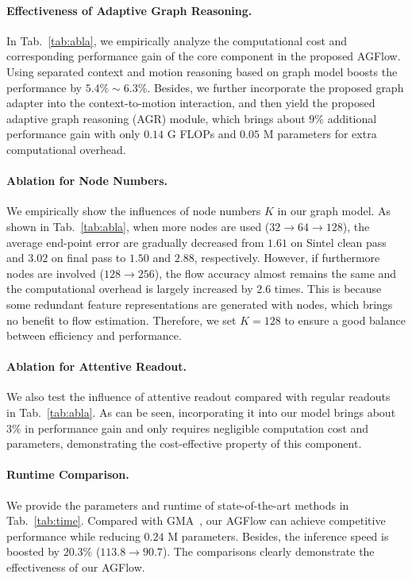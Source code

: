 \documentclass[letterpaper]{article} %
\begin{document}
\paragraph{Effectiveness of Adaptive Graph Reasoning.}
In Tab.~\ref{tab:abla}, we empirically analyze the computational cost and corresponding performance gain of the core component in the proposed AGFlow. Using separated context and motion reasoning based on graph model boosts the performance by $5.4\% \sim 6.3\%$. Besides, we further incorporate the proposed graph adapter into the context-to-motion interaction, and then yield the proposed adaptive graph reasoning (AGR) module, which brings about $9\%$ additional performance gain with only $0.14$ G FLOPs and $0.05$ M parameters for extra computational overhead.

\paragraph{Ablation for Node Numbers.}
We empirically show the influences of node numbers $K$ in our graph model. As shown in Tab.~\ref{tab:abla}, when more nodes are used ($32 \rightarrow 64 \rightarrow 128$), the average end-point error are gradually decreased from $1.61$ on Sintel clean pass and $3.02$ on final pass to $1.50$ and $2.88$, respectively. However, if furthermore nodes are involved ($128 \rightarrow 256$), the flow accuracy almost remains the same and the computational overhead is largely increased by $2.6$ times. This is because some redundant feature representations are generated with nodes, which brings no benefit to flow estimation. Therefore, we set $K = 128$ to ensure a good balance between efficiency and performance.

\paragraph{Ablation for Attentive Readout.}
We also test the influence of attentive readout compared with regular readouts~\cite{Li2018BeyondGL} in Tab.~\ref{tab:abla}. As can be seen, incorporating it into our model brings about $3\%$ in performance gain and only requires negligible computation cost and parameters, demonstrating the cost-effective property of this component.

\paragraph{Runtime Comparison.}
We provide the parameters and runtime of state-of-the-art methods in Tab.~\ref{tab:time}. Compared with GMA~\cite{Jiang2021LearningTE}, our AGFlow can achieve competitive performance while reducing $0.24$ M parameters. Besides, the inference speed is boosted by $20.3\%$ ($113.8 \rightarrow 90.7$). The comparisons clearly demonstrate the effectiveness of our AGFlow.
\end{document}
